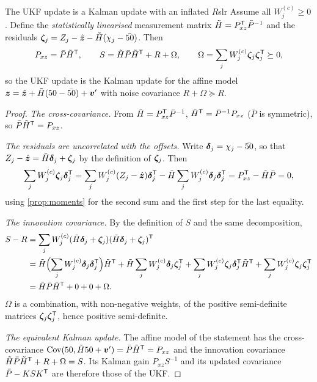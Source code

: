 \begin{theorem}{The UKF update is a Kalman update with an inflated $R$}{slr}
Assume all $W^{(c)}_j\ge0$. Define the \emph{statistically linearised}
measurement matrix $\tilde H=P_{xz}^{\mathsf{T}}\bar P^{-1}$ and the residuals
$\bm{\zeta}_j=Z_j-\hat{\bm{z}}-\tilde H(\chi_j-\bar{50})$. Then
\[
  P_{xz}=\bar P\tilde H^{\mathsf{T}},\qquad
  S=\tilde H\bar P\tilde H^{\mathsf{T}}+R+\Omega,\qquad
  \Omega=\sum_jW^{(c)}_j\bm{\zeta}_j\bm{\zeta}_j^{\mathsf{T}}\succeq0,
\]
so the UKF update is the Kalman update for the affine model
$\bm{z}=\hat{\bm{z}}+\tilde H(50-\bar{50})+\bm{v}'$ with noise covariance
$R+\Omega\succeq R$.
\end{theorem}

\begin{proof}
\emph{The cross-covariance.} From $\tilde H=P_{xz}^{\mathsf{T}}\bar P^{-1}$,
$\tilde H^{\mathsf{T}}=\bar P^{-1}P_{xz}$ ($\bar P$ is symmetric), so
$\bar P\tilde H^{\mathsf{T}}=P_{xz}$.

\emph{The residuals are uncorrelated with the offsets.} Write
$\bm{\delta}_j=\chi_j-\bar{50}$, so that
$Z_j-\hat{\bm{z}}=\tilde H\bm{\delta}_j+\bm{\zeta}_j$ by the definition of
$\bm{\zeta}_j$. Then
\[
  \sum_jW^{(c)}_j\bm{\zeta}_j\bm{\delta}_j^{\mathsf{T}}
  =\sum_jW^{(c)}_j(Z_j-\hat{\bm{z}})\bm{\delta}_j^{\mathsf{T}}
   -\tilde H\sum_jW^{(c)}_j\bm{\delta}_j\bm{\delta}_j^{\mathsf{T}}
  =P_{xz}^{\mathsf{T}}-\tilde H\bar P=0 ,
\]
using \cref{prop:moments} for the second sum and the first step for the
last equality.

\emph{The innovation covariance.} By the definition of $S$ and the same
decomposition,
\begin{align*}
  S-R&=\sum_jW^{(c)}_j(\tilde H\bm{\delta}_j+\bm{\zeta}_j)
       (\tilde H\bm{\delta}_j+\bm{\zeta}_j)^{\mathsf{T}}\\
  &=\tilde H\Bigl(\sum_jW^{(c)}_j\bm{\delta}_j\bm{\delta}_j^{\mathsf{T}}\Bigr)\tilde H^{\mathsf{T}}
   +\tilde H\sum_jW^{(c)}_j\bm{\delta}_j\bm{\zeta}_j^{\mathsf{T}}
   +\sum_jW^{(c)}_j\bm{\zeta}_j\bm{\delta}_j^{\mathsf{T}}\tilde H^{\mathsf{T}}
   +\sum_jW^{(c)}_j\bm{\zeta}_j\bm{\zeta}_j^{\mathsf{T}}\\
  &=\tilde H\bar P\tilde H^{\mathsf{T}}+0+0+\Omega .
\end{align*}
$\Omega$ is a combination, with non-negative weights, of the positive
semi-definite matrices $\bm{\zeta}_j\bm{\zeta}_j^{\mathsf{T}}$, hence positive
semi-definite.

\emph{The equivalent Kalman update.} The affine model of the statement
has the cross-covariance $\operatorname{Cov}(50,\tilde H50+\bm{v}')=\bar P\tilde H^{\mathsf{T}}=
P_{xz}$ and the innovation covariance $\tilde H\bar P\tilde H^{\mathsf{T}}+R+\Omega=
S$. Its Kalman gain $P_{xz}S^{-1}$ and its updated covariance
$\bar P-KSK^{\mathsf{T}}$ are therefore those of the UKF.
\end{proof}

